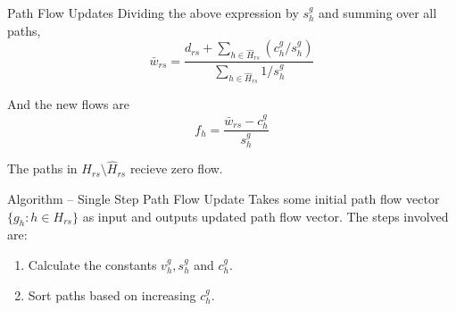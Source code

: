 \documentclass{beamer}
\begin{document}
\begin{frame}{Path Flow Updates}
Dividing the above expression by $s_h^g$ and summing over
all paths,
\[
    \bar{w}_{rs} = \frac{d_{rs} + \sum_{h\in \hat{H}_{rs}}
    ({c_h^g}/{s_h^g})}{\sum_{h\in\hat{H}_{rs}}{1}/{s_h^g}}
\]

And the new flows are
\[
    f_h = \frac{\bar{w}_{rs}-c_h^g}{s^g_h}
\]

The paths in $H_{rs}\setminus \hat{H}_{rs}$ recieve
zero flow.
\end{frame}


\begin{frame}{Algorithm -- Single Step Path Flow Update}
Takes some initial path flow vector $\{g_h: h\in H_{rs}\}$
as input and outputs updated path flow vector.
The steps involved are:
\begin{enumerate}
    \item Calculate the constants $v_h^g, s_h^g$ and
    $c_h^g$.

    \item Sort paths based on increasing $c_h^g$.
\end{enumerate}
\end{frame}
\end{document}

